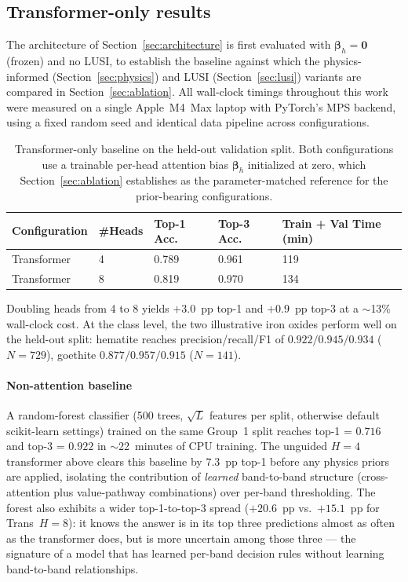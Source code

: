 \documentclass[preprint,12pt]{elsarticle}
\begin{document}
\subsection{Transformer-only results}
\label{sec:trans_only_results}

The architecture of Section~\ref{sec:architecture} is first evaluated with $\bm{\beta}_h = \mathbf{0}$ (frozen) and no LUSI, to establish the baseline against which the physics-informed (Section~\ref{sec:physics}) and LUSI (Section~\ref{sec:lusi}) variants are compared in Section~\ref{sec:ablation}.
All wall-clock timings throughout this work were measured on a single Apple~M4~Max laptop with PyTorch's MPS backend, using a fixed random seed and identical data pipeline across configurations.

\begin{table}[!htbp]
\centering
\small
\caption{Transformer-only baseline on the held-out validation split. Both configurations use a trainable per-head attention bias $\bm{\beta}_h$ initialized at zero, which Section~\ref{sec:ablation} establishes as the parameter-matched reference for the prior-bearing configurations.}
\label{tab:trans_only_results}
\begin{tabular}{p{}p{}p{}p{}p{}}
\hline
\rowcolor[gray]{0.85}
\textbf{Configuration} & \textbf{\#Heads} & \textbf{Top-1 Acc.} & \textbf{Top-3 Acc.} & \textbf{Train + Val Time (min)} \\
\hline
Transformer & 4 & 0.789 & 0.961 & 119 \\
\hline
Transformer & 8 & 0.819 & 0.970 & 134 \\
\hline
\end{tabular}
\end{table}

Doubling heads from 4 to 8 yields $+3.0$~pp top-1 and $+0.9$~pp top-3 at a $\sim$13\% wall-clock cost.
At the class level, the two illustrative iron oxides perform well on the held-out split:
hematite reaches precision/recall/F1 of $0.922 / 0.945 / 0.934$ ($N = 729$), goethite $0.877 / 0.957 / 0.915$ ($N = 141$).

\paragraph{Non-attention baseline} A random-forest classifier (500 trees, $\sqrt{L}$ features per split, otherwise default scikit-learn settings) trained on the same Group~1 split reaches top-1 = $0.716$ and top-3 = $0.922$ in $\sim$22~minutes of CPU training. The unguided $H = 4$ transformer above clears this baseline by $7.3$~pp top-1 before any physics priors are applied, isolating the contribution of \emph{learned} band-to-band structure (cross-attention plus value-pathway combinations) over per-band thresholding. The forest also exhibits a wider top-1-to-top-3 spread ($+20.6$~pp vs.\ $+15.1$~pp for Trans~$H = 8$): it knows the answer is in its top three predictions almost as often as the transformer does, but is more uncertain among those three --- the signature of a model that has learned per-band decision rules without learning band-to-band relationships.
\end{document}
